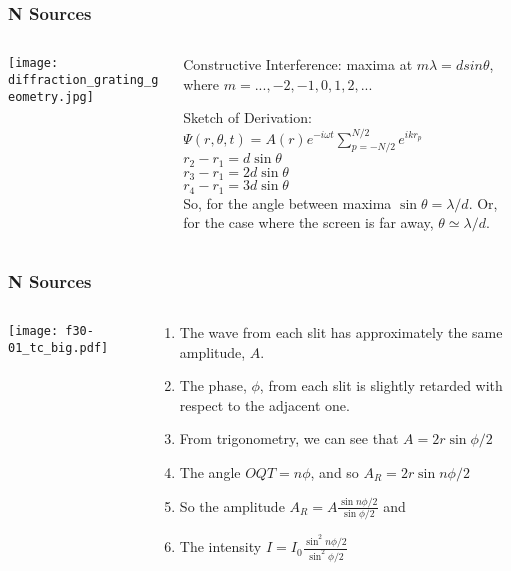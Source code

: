 \documentclass[pdf, handout, hideothersubsections]{beamer}
\begin{document}
\begin{frame}
\frametitle{N Sources}

\begin{columns}
\begin{column}{0.5\textwidth}
\texttt{[image: diffraction\_grating\_geometry.jpg]}
\end{column}

\begin{column}{0.5\textwidth}
Constructive Interference: maxima at $m \lambda = d sin \theta$, where
$m = ..., -2, -1, 0, 1, 2,...$

Sketch of Derivation:\\
$\Psi(r, \theta, t) = A(r) e^{-i \omega t} \sum_{p=-N/2}^{N/2} e^{i k
  r_p}$ \\
$r_2 - r_1 = d \sin{\theta}$ \\
$r_3 - r_1 = 2 d \sin{\theta}$ \\
$r_4 - r_1 = 3 d \sin{\theta}$ \\
So, for the angle between maxima $\sin{\theta} = \lambda / d$. Or, for
the case where the screen is far away, $\theta \simeq \lambda / d$.
\end{column}

\end{columns}
\end{frame}

\begin{frame}
\frametitle{N Sources}

\begin{columns}
\begin{column}{0.5\textwidth}
\texttt{[image: f30-01\_tc\_big.pdf]}
\end{column}

\begin{column}{0.5\textwidth}
\begin{enumerate}
\item The wave from each slit has approximately the same amplitude, $A$.
\pause
\item The phase, $\phi$, from each slit is slightly retarded with respect to
  the adjacent one.
\pause
\item From trigonometry, we can see that $A = 2 r \sin{\phi/2}$
\pause
\item The angle $OQT = n \phi$, and so $A_R = 2 r \sin{n \phi / 2}$
\pause
\item So the amplitude $A_R = A \frac{\sin{n \phi /2}}{\sin{\phi/2}}$
    and
\pause
\item The intensity $I = I_0 \frac{\sin^2{n \phi /2}}{\sin^2{\phi/2}}$

\end{enumerate}
\end{column}

\end{columns}

\end{frame}
\end{document}
